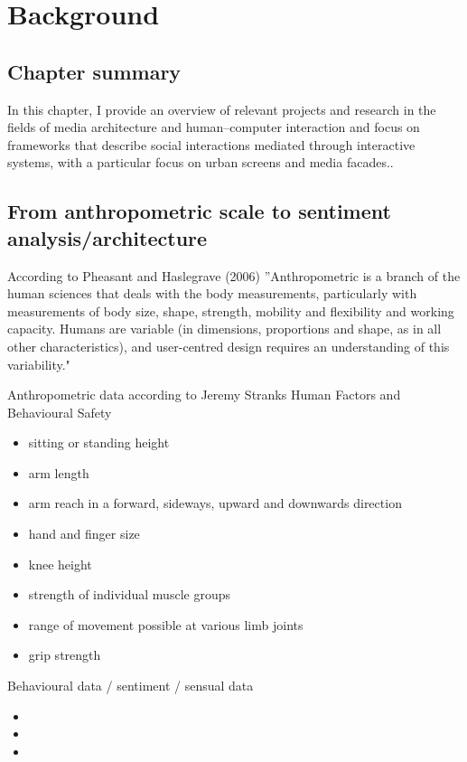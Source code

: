 \chapter{Background}
\label{chapterlabel2}

\section*{Chapter summary}

In this chapter, I provide an overview of relevant projects and research
in the fields of media architecture and human–computer interaction and focus on
frameworks that describe social interactions mediated through interactive systems,
with a particular focus on urban screens and media facades..\newpage


\section{From anthropometric scale to sentiment analysis/architecture}

According to Pheasant and Haslegrave (2006) \cite{Pheasant2006} ''Anthropometric is a branch of the human sciences that deals with the body measurements, particularly with measurements of body size, shape, strength, mobility and flexibility and working capacity. Humans are variable (in dimensions, proportions and shape, as in all other characteristics), and user-centred design requires an understanding of this variability."

Anthropometric data according to Jeremy Stranks Human Factors and Behavioural Safety \cite {Stranks2007}

\begin{itemize} 
  \item sitting or standing height
  \item arm length
  \item arm reach in a forward, sideways, upward and downwards direction
  \item hand and finger size
  \item knee height
  \item strength of individual muscle groups
  \item range of movement possible at various limb joints
  \item grip strength
\end{itemize}

Behavioural data / sentiment / sensual data 
\begin{itemize} 
  \item 
  \item 
  \item 
\end{itemize}


